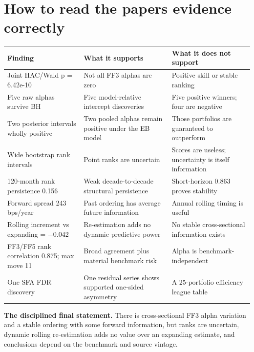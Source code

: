 \hypertarget{interpretation}{}
\hypertarget{how-to-read-the-papers-evidence-correctly}{%
\chapter{How to read the paper\textquotesingle s evidence
correctly}\label{how-to-read-the-papers-evidence-correctly}}

\begin{longtable}[]{@{}p{}p{}p{}@{}}
\toprule\noalign{}
Finding & What it supports & What it does not support \\
\midrule\noalign{}
\endhead
\bottomrule\noalign{}
\endlastfoot
Joint HAC/Wald p = 6.42e-10 & Not all FF3 alphas are zero & Positive
skill or stable ranking \\
Five raw alphas survive BH & Five model-relative intercept discoveries &
Five positive winners; four are negative \\
Two posterior intervals wholly positive & Two pooled alphas remain
positive under the EB model & Those portfolios are guaranteed to
outperform \\
Wide bootstrap rank intervals & Point ranks are uncertain & Scores are
useless; uncertainty is itself information \\
120-month rank persistence 0.156 & Weak decade-to-decade structural
persistence & Short-horizon 0.863 proves stability \\
Forward spread 243 bps/year & Past ordering has average future
information & Annual rolling timing is useful \\
Rolling increment vs expanding = \ensuremath{-}0.042 & Re-estimation adds no dynamic
predictive power & No stable cross-sectional information exists \\
FF3/FF5 rank correlation 0.875; max move 11 & Broad agreement plus
material benchmark risk & Alpha is benchmark-independent \\
One SFA FDR discovery & One residual series shows supported one-sided
asymmetry & A 25-portfolio efficiency league table \\
\end{longtable}

\textbf{The disciplined final statement.} There is cross-sectional FF3
alpha variation and a stable ordering with some forward information, but
ranks are uncertain, dynamic rolling re-estimation adds no value over an
expanding estimate, and conclusions depend on the benchmark and source
vintage.

